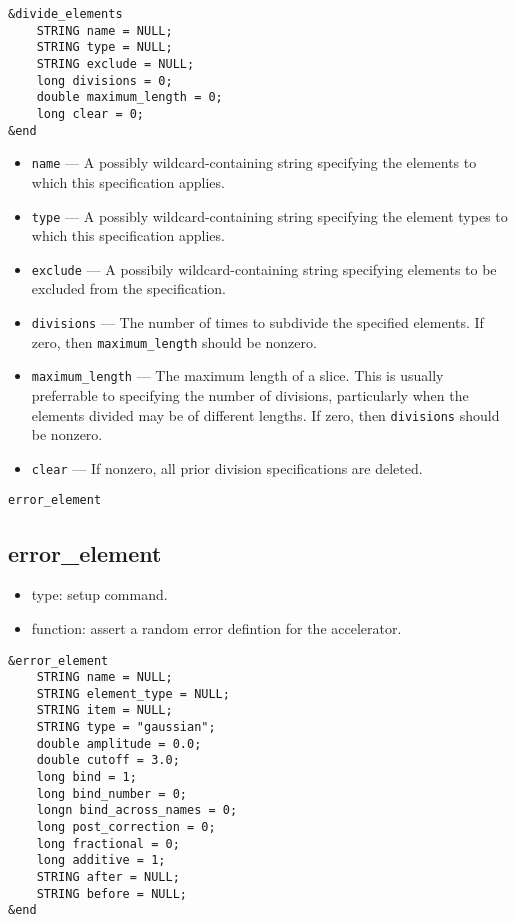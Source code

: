 \documentclass[11pt]{article}
\begin{document}
\begin{verbatim}
&divide_elements
    STRING name = NULL;
    STRING type = NULL;
    STRING exclude = NULL;
    long divisions = 0;
    double maximum_length = 0;
    long clear = 0;
&end
\end{verbatim}

\begin{itemize}
\item \verb|name| --- A possibly wildcard-containing string specifying
	the elements to which this specification applies.
\item \verb|type| --- A possibly wildcard-containing string specifying
 	the element types to which this specification applies.
\item \verb|exclude| --- A possibily wildcard-containing string specifying
 	elements to be excluded from the specification.
\item \verb|divisions| --- The number of times to subdivide the specified
	elements.  If zero, then \verb|maximum_length| should be nonzero.
\item \verb|maximum_length| --- The maximum length of a slice.  This is
	usually preferrable to specifying the number of divisions, particularly
	when the elements divided may be of different lengths.  If zero, then
	\verb|divisions| should be nonzero.
\item \verb|clear| --- If nonzero, all prior division specifications are
	deleted.
\end{itemize}

\begin{latexonly}
\newpage
\begin{center}{\Large\verb|error_element|}\end{center}
\end{latexonly}
\subsection{error\_element \label{subsec:errorelement}}

\begin{itemize}
\item type: setup command.
\item function: assert a random error defintion for the accelerator.
\end{itemize}

\begin{verbatim}
&error_element
    STRING name = NULL;
    STRING element_type = NULL;
    STRING item = NULL;
    STRING type = "gaussian";
    double amplitude = 0.0;
    double cutoff = 3.0;
    long bind = 1;
    long bind_number = 0;
    longn bind_across_names = 0;
    long post_correction = 0;
    long fractional = 0;
    long additive = 1;
    STRING after = NULL;
    STRING before = NULL;
&end
\end{verbatim}
\end{document}
